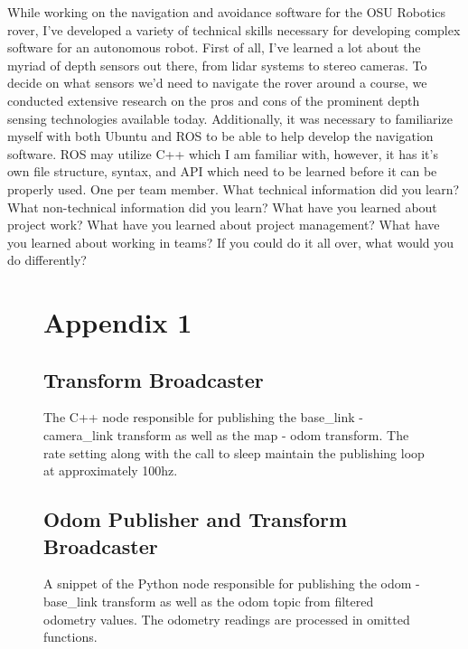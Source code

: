 \documentclass[10pt, oneside,onecolumn]{IEEEtran}
\begin{document}
\begin{titlepage}
While working on the navigation and avoidance software for the OSU Robotics rover, I’ve developed a variety of technical skills necessary for developing complex software for an autonomous robot. First of all, I’ve learned a lot about the myriad of depth sensors out there, from lidar systems to stereo cameras. To decide on what sensors we’d need to navigate the rover around a course, we conducted extensive research on the pros and cons of the prominent depth sensing technologies available today. Additionally, it was necessary to familiarize myself with both Ubuntu and ROS to be able to help develop the navigation software. ROS may utilize C++ which I am familiar with, however, it has it’s own file structure, syntax, and API which need to be learned before it can be properly used. 
One per team member.
What technical information did you learn?
What non-technical information did you learn?
What have you learned about project work?
What have you learned about project management?
What have you learned about working in teams?
If you could do it all over, what would you do differently?

\begin{figure}[p!]
\section{Appendix 1}
\subsection{Transform Broadcaster}

\centering
\caption{The C++ node responsible for publishing the base\_link - camera\_link transform as well as the map - odom transform. The rate setting along with the call to sleep maintain the publishing loop at approximately 100hz.}
\end{figure}

\begin{figure}[p!]
\subsection{Odom Publisher and Transform Broadcaster}

\centering
\caption{A snippet of the Python node responsible for publishing the odom - base\_link transform as well as the \/odom topic from filtered odometry values. The odometry readings are processed in omitted functions.}
\end{figure}

\begin{figure}[p!]

\end{figure}
\end{titlepage}
\end{document}
